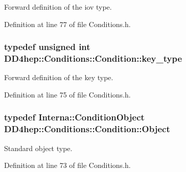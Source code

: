 Forward definition of the iov type. 

Definition at line 77 of file Conditions.h.\hypertarget{class_d_d4hep_1_1_conditions_1_1_condition_a7528efa762e8cc072ef80ea67c3531f9}{
\subsubsection[{key\_\-type}]{\setlength{\rightskip}{0pt plus 5cm}typedef unsigned int {\bf DD4hep::Conditions::Condition::key\_\-type}}}
\label{class_d_d4hep_1_1_conditions_1_1_condition_a7528efa762e8cc072ef80ea67c3531f9}


Forward definition of the key type. 

Definition at line 75 of file Conditions.h.\hypertarget{class_d_d4hep_1_1_conditions_1_1_condition_a6fc8dae0dad41db6a237920c85f8a55d}{
\subsubsection[{Object}]{\setlength{\rightskip}{0pt plus 5cm}typedef {\bf Interna::ConditionObject} {\bf DD4hep::Conditions::Condition::Object}}}
\label{class_d_d4hep_1_1_conditions_1_1_condition_a6fc8dae0dad41db6a237920c85f8a55d}


Standard object type. 

Definition at line 73 of file Conditions.h.

